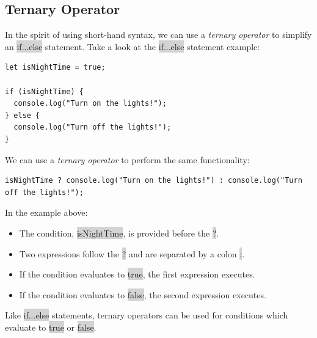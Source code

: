 \documentclass[11pt]{article}
\begin{document}
\subsection{Ternary Operator}
In the spirit of using short-hand syntax, we can use a \textit{ternary operator} to simplify an \colorbox{lightgray}{if...else} statement. Take a look at the \colorbox{lightgray}{if...else} statement example: 
\begin{lstlisting}
let isNightTime = true;

if (isNightTime) {
  console.log("Turn on the lights!");
} else {
  console.log("Turn off the lights!");
}
\end{lstlisting}
We can use a \textit{ternary operator} to perform the same functionality:
\begin{lstlisting}
isNightTime ? console.log("Turn on the lights!") : console.log("Turn off the lights!");
\end{lstlisting}
In the example above:
\begin{itemize}[leftmargin = *]
\item The condition, \colorbox{lightgray}{isNightTime}, is provided before the \colorbox{lightgray}{?}.
\item Two expressions follow the \colorbox{lightgray}{?} and are separated by a colon \colorbox{lightgray}{:}.
\item If the condition evaluates to \colorbox{lightgray}{true}, the first expression executes.
\item If the condition evaluates to \colorbox{lightgray}{false}, the second expression executes.
\end{itemize}
Like \colorbox{lightgray}{if...else} statements, ternary operators can be used for conditions which evaluate to \colorbox{lightgray}{true} or \colorbox{lightgray}{false}.
\end{document}
